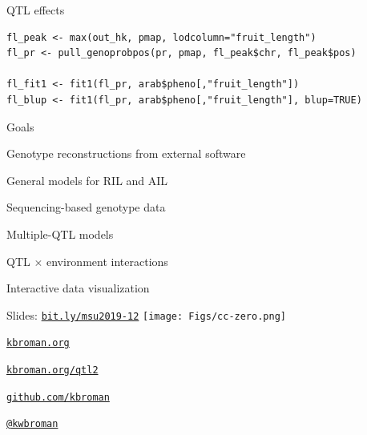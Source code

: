 \documentclass[12pt,t,aspectratio=169]{beamer}
\begin{document}
\begin{frame}[c,fragile]{QTL effects}

\begin{center} \begin{minipage}[c]{11.3cm} \begin{semiverbatim}
\begin{lstlisting}[linewidth=11.3cm]
fl_peak <- max(out_hk, pmap, lodcolumn="fruit_length")
fl_pr <- pull_genoprobpos(pr, pmap, fl_peak$chr, fl_peak$pos)

fl_fit1 <- fit1(fl_pr, arab$pheno[,"fruit_length"])
fl_blup <- fit1(fl_pr, arab$pheno[,"fruit_length"], blup=TRUE)
\end{lstlisting}
\end{semiverbatim} \end{minipage} \end{center}

\end{frame}









\begin{frame}{Goals}

  \bbi
\item Genotype reconstructions from external software

\item General models for RIL and AIL

\item Sequencing-based genotype data

\item Multiple-QTL models

\item QTL $\times$ environment interactions

\item Interactive data visualization
  \ei

\end{frame}




\begin{frame}[c]{}

\Large

Slides: \href{https://bit.ly/msu2019-12}{\tt bit.ly/msu2019-12} \quad
\texttt{[image: Figs/cc-zero.png]}

\vspace{7mm}

\href{https://kbroman.org}{\tt \lolit kbroman.org}

\vspace{7mm}

\href{https://kbroman.org/qtl2}{\tt kbroman.org/qtl2}

\vspace{7mm}

\href{https://github.com/kbroman}{\tt \lolit github.com/kbroman}

\vspace{7mm}

\href{https://twitter.com/kwbroman}{\tt \lolit @kwbroman}


\end{frame}
\end{document}
